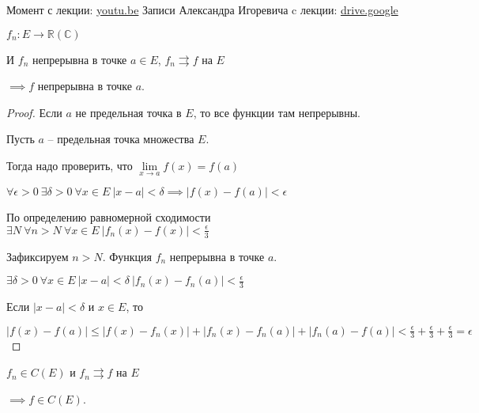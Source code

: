 
\begin{remark}
    Момент с лекции: \href{https://youtu.be/OR_LP_E1UQ0?t=161}{youtu.be} \newline
    Записи Александра Игоревича c лекции: \href{https://drive.google.com/file/d/1RjjQ-4fzkRGXTJR-QFnaVCY-DEZRW8Do/view}{drive.google}
\end{remark}

\begin{theorem}\slashns
	
	$f_n : E \to \mathbb{R}(\mathbb{C})$
	
	И $f_n$ непрерывна в точке $a \in E$, $f_n \rightrightarrows f$ на $E$
	
	$\implies f$ непрерывна в точке $a$.
\end{theorem}

\begin{proof}\slashns
	
	Если $a$ не предельная точка в $E$, то все функции там непрерывны.
	
	Пусть $a$ -- предельная точка множества $E$.
	
	Тогда надо проверить, что $\lim\limits_{x \to a} f(x) = f(a)$
	
	$\forall \epsilon > 0 \ \exists \delta > 0 \ \forall x \in E \ |x-a| < \delta \implies |f(x) - f(a)| < \epsilon$
	
	По определению равномерной сходимости $\exists N \ \forall n > N \ \forall x \in E \ |f_n(x) - f(x)| < \frac{\epsilon}{3}$
	
	Зафиксируем $n > N$. Функция $f_n$ непрерывна в точке $a$.
	
	$\exists \delta> 0 \ \forall x\in E \ |x-a| < \delta \ |f_n(x) - f_n(a)| < \frac{\epsilon}{3}$
	
	Если $|x-a| < \delta$ и $x \in E$, то 
	
	
	$|f(x) - f(a)| \le |f(x) - f_n(x)| + |f_n(x) - f_n(a)| + |f_n(a) - f(a)| < \frac{\epsilon}{3} + \frac{\epsilon}{3} + \frac{\epsilon}{3} = \epsilon$
\end{proof}

\begin{consequence}\slashns
	
	$f_n \in C(E)$ и  $f_n \rightrightarrows f$ на $E$
	
	$\implies f \in C(E)$.
\end{consequence}

